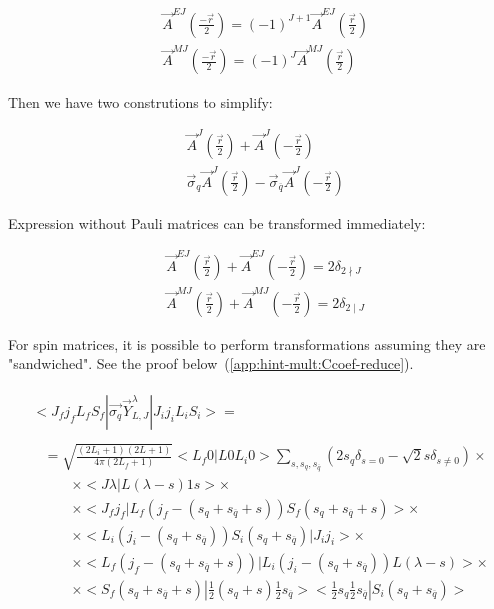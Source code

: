 \begin{align}
    &\vec{A}^{EJ}(\frac{-\vec{r}}{2}) = (-1)^{J+1} \vec{A}^{EJ}(\frac{\vec{r}}{2}) \\
    &\vec{A}^{MJ}(\frac{-\vec{r}}{2}) = (-1)^{J} \vec{A}^{MJ}(\frac{\vec{r}}{2})
\end{align}

Then we have two construtions to simplify:

\begin{align}
    &\vec{A}^{J}(\frac{\vec{r}}{2}) + \vec{A}^{J}(-\frac{\vec{r}}{2}) \\
    &\vec{\sigma}_{q} \vec{A}^{J}(\frac{\vec{r}}{2}) - \vec{\sigma}_{\overline{q}} \vec{A}^{J}(-\frac{\vec{r}}{2}) \label{eq:sigmaAJ}
\end{align}

Expression without Pauli matrices can be transformed immediately:

\begin{align}
    &\vec{A}^{EJ}(\frac{\vec{r}}{2}) + \vec{A}^{EJ}(-\frac{\vec{r}}{2}) = 2 \delta_{2 \nmid J} \\
    &\vec{A}^{MJ}(\frac{\vec{r}}{2}) + \vec{A}^{MJ}(-\frac{\vec{r}}{2}) = 2 \delta_{2 \mid J}
\end{align}

For spin matrices, it is possible to perform transformations assuming they are "sandwiched". See the proof below~(\cref{app:hint-mult:Ccoef-reduce}).

\begin{align}
    \begin{split}
        <J_f j_f L_f S_f| \vec{\sigma_q} \vec{Y}_{L, J}^\lambda |J_i j_i L_i S_i> =
    \end{split} \\
    \begin{split}
        &= \sqrt{\frac{(2L_i + 1)(2L+1)}{4 \pi (2L_f + 1)}} < L_f 0 | L 0 L_i 0 > \sum_{s, s_{q}, s_{\overline{q}}} (2 s_q \delta_{s = 0} - \sqrt{2} s \delta_{s \neq 0}) \times \\
    &\qquad\times <J \lambda| L (\lambda - s) 1 s> \times\\
    &\qquad\times <J_f j_f| L_f (j_f-(s_q + s_{\overline{q}} + s)) S_f (s_q + s_{\overline{q}} + s)> \times \\
        &\qquad\times <L_i (j_i - (s_q + s_{\overline{q}})) S_i (s_q + s_{\overline{q}})| J_i j_i> \times \\
        &\qquad\times <L_f (j_f - (s_q + s_{\overline{q}} + s))| L_i (j_i - (s_q + s_{\overline{q}})) L (\lambda - s)>  \times\\
        &\qquad\times <S_f (s_q + s_{\overline{q}} + s)| \frac{1}{2} (s_{q}+s) \frac{1}{2} s_{\overline{q}}> <\frac{1}{2} s_{q} \frac{1}{2} s_{\overline{q}} |S_i (s_q + s_{\overline{q}})>
    \end{split}
\end{align}

